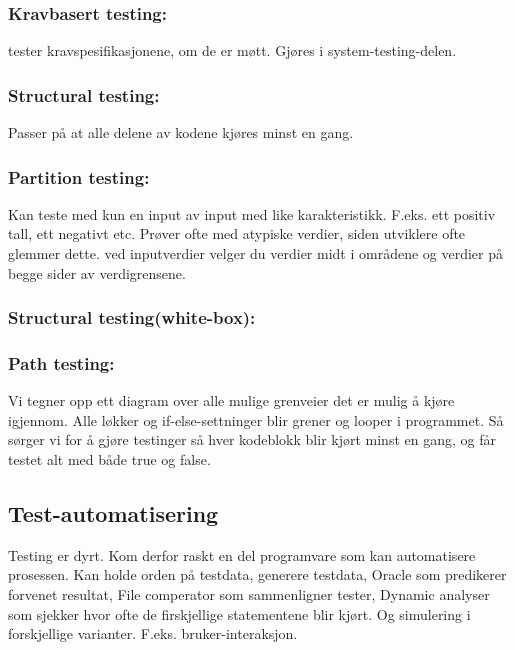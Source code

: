 \documentclass[11pt]{article}
\begin{document}
\subsubsection{Kravbasert testing:}
\label{sec-9.2.5}

    tester kravspesifikasjonene, om de er møtt. Gjøres i system-testing-delen.
\subsubsection{Structural testing:}
\label{sec-9.2.6}

    Passer på at alle delene av kodene kjøres minst en gang.
\subsubsection{Partition testing:}
\label{sec-9.2.7}

    Kan teste med kun en input av input med like karakteristikk. F.eks. ett positiv tall, 
    ett negativt etc. Prøver ofte med atypiske verdier, siden utviklere ofte glemmer dette. 
    ved inputverdier velger du verdier midt i områdene og verdier på begge sider av verdigrensene.
\subsubsection{Structural testing(white-box):}
\label{sec-9.2.8}
\subsubsection{Path testing:}
\label{sec-9.2.9}

    Vi tegner opp ett diagram over alle mulige grenveier det er mulig å kjøre igjennom. 
    Alle løkker og if-else-settninger blir grener  og looper i programmet. Så sørger vi for 
    å gjøre testinger så hver kodeblokk blir kjørt minst en gang, og får testet alt med både true og false.
    
\subsection{Test-automatisering}
\label{sec-9.3}


   Testing er dyrt. Kom derfor raskt en del programvare som kan automatisere prosessen. 
   Kan holde orden på testdata, generere testdata, Oracle som predikerer forvenet resultat, 
   File comperator som sammenligner tester, Dynamic analyser som sjekker hvor ofte de firskjellige
   statementene blir kjørt. Og simulering i forskjellige varianter. F.eks. bruker-interaksjon.
\end{document}
